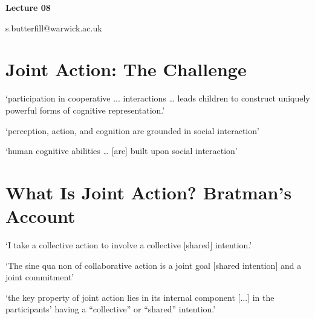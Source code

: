 \documentclass[12pt]{extarticle}
\date{}
\makeatletter
\def \ititle {Origins of Mind}
\def \iemail{s.butterfill@warwick.ac.uk}
\makeatother
\begin{document}
\begin{multicols}{3}

\setlength\footnotesep{1em}







\def \ititle {Lecture 08}

\begin{center}

{\Large

\textbf{\ititle}

}



\iemail %

\end{center}



\section{Joint Action: The Challenge}

‘participation in cooperative ... interactions … leads children to construct uniquely powerful forms of cognitive representation.’
\citep{Moll:2007gu}

‘perception, action, and cognition are grounded in social interaction’
\citep[p.\ 103]{Knoblich:2006bn}

‘human cognitive abilities … [are] built upon social interaction’
\citep{sinigaglia:2008_roots}



\section{What Is Joint Action? Bratman’s Account}

‘I take a collective action to involve a collective [shared] intention.’
\citep[p.~5]{Gilbert:2006wr}

‘The sine qua non of collaborative action is a joint goal [shared intention] and a joint commitment’
\citep[p.~181]{tomasello:2008origins}

‘the key property of joint action lies in its internal component [...] in the participants’ having
a “collective” or “shared” intention.’
\citep[pp.~444--5]{alonso_shared_2009}


\end{multicols}
\end{document}
